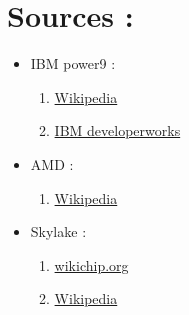 \documentclass[a4paper,10pt]{article}
\begin{document}
\section{Sources :}
\begin{itemize}
\item IBM power9 : 
 \begin{enumerate}
  \item \href{https://en.wikipedia.org/wiki/POWER9}{Wikipedia}
  \item \href{https://www.ibm.com/developerworks/community/wikis/home?lang=en#/wiki/Power\%20Systems/page/AIX\%20Virtual\%20User\%20Group\%20-\%20USA}{IBM developerworks}
 \end{enumerate}
 \item AMD : 
 \begin{enumerate}
  \item \href{https://en.wikipedia.org/wiki/Zen_(microarchitecture)}{Wikipedia}

 \end{enumerate}
 \item Skylake : 
  \begin{enumerate}
  \item  \href{https://en.wikichip.org/wiki/intel/microarchitectures/skylake_(client)}{wikichip.org}
 \item \href{https://en.wikipedia.org/wiki/Skylake_(microarchitecture)}{Wikipedia}
 \end{enumerate}
 
 
 

\end{itemize}


  
\end{document}
